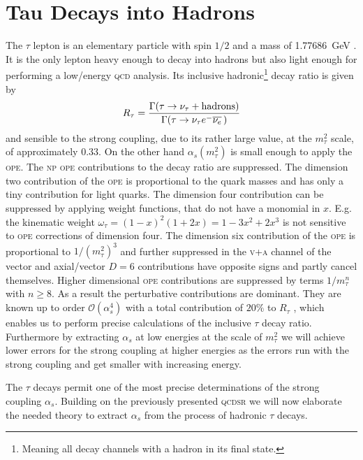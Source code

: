 \documentclass[../../index.tex]{subfiles}
\begin{document}
\chapter{Tau Decays into Hadrons}
The \(\tau\) lepton is an elementary particle with spin \(1/2\) and a mass of
\SI{1.77686}{\giga\eV} \cite{PDG2018}. It is the only lepton heavy enough to
decay into hadrons but also light enough for performing a low\-/energy
\textsc{qcd} analysis. Its inclusive hadronic\footnote{Meaning all decay
  channels with a hadron in its final state.} decay ratio is given by
\begin{equation}
  \label{eq:inclusiveRatio}
  R_\tau = \frac{\Gamma(\tau \to \nu_\tau + \text{hadrons})}{\Gamma(\tau \to \nu_\tau e^- \overline{\nu_e}\,)}
\end{equation}
and sensible to the strong coupling, due to its rather large value, at the
\(m_\tau^2\) scale, of approximately \(0.33\). On the other hand
\(\alpha_s(m_\tau^2)\) is small enough to apply the \textsc{ope}. The
\textsc{np} \textsc{ope} contributions to the decay ratio are suppressed. The
dimension two contribution of the \textsc{ope} is proportional to the quark
masses and has only a tiny contribution for light quarks. The dimension four
contribution can be suppressed by applying weight functions, that do not have a
monomial in \(x\). E.g. the kinematic weight
\(\omega_\tau=(1-x)^2(1+2x)=1-3x^2+2x^3\) is not sensitive to \textsc{ope}
corrections of dimension four. The dimension six contribution of the
\textsc{ope} is proportional to \(1/(m_\tau^2)^3\) and further suppressed in the
\textsc{v+a} channel of the vector and axial\-/vector \(D=6\) contributions have
opposite signs and partly cancel themselves. Higher dimensional \textsc{ope}
contributions are suppressed by terms \(1/m_\tau^n\) with \(n \geq 8\). As a
result the perturbative contributions are dominant. They are known up to order
\(\mathcal{O}(\alpha_s^4)\) with a total contribution of \(20\%\) to \(R_\tau\)
\cite{Pich2016a}, which enables us to perform precise calculations of the
inclusive \(\tau\) decay ratio. Furthermore by extracting \(\alpha_s\) at low
energies at the scale of \(m_\tau^2\) we will achieve lower errors for the
strong coupling at higher energies as the errors run with the strong coupling
and get smaller with increasing energy.

The \(\tau\) decays permit one of the most precise determinations of the strong
coupling \(\alpha_s\). Building on the previously presented \textsc{qcdsr} we
will now elaborate the needed theory to extract \(\alpha_s\) from the process of
hadronic \(\tau\) decays.
\end{document}
